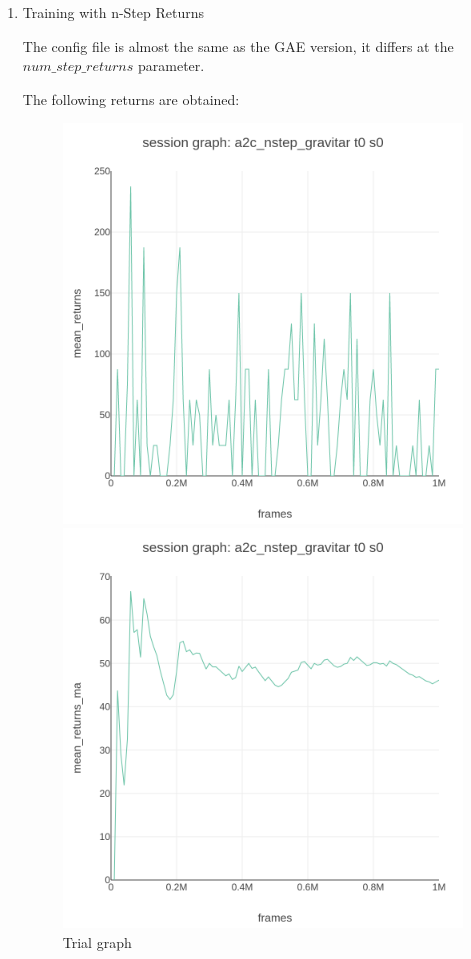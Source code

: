 \documentclass[12pt,a4paper]{report}
\begin{document}
\begin{enumerate}
		\pagebreak
		\item Training with n-Step Returns
		
		The config file is almost the same as the GAE version, it differs at the $num\_step\_returns$ parameter.
		
		The following returns are obtained:
		
		\begin{figure}[ht!]
			\begin{minipage}[c]{0.5\linewidth}
				\centering
				\includegraphics[height=0.3\textheight, width=0.9\linewidth]{a2c_nstep_gravitar_t0_s0_session_graph_eval_mean_returns_vs_frames.png}
				\caption{Trial graph}
			\end{minipage}\hfill
			\begin{minipage}[c]{0.5\linewidth}	
				\centering
				\includegraphics[height=0.3\textheight, width=0.9\linewidth]{a2c_nstep_gravitar_t0_s0_session_graph_eval_mean_returns_ma_vs_frames.png}

\end{minipage}
\end{figure}
\end{enumerate}
\end{document}
